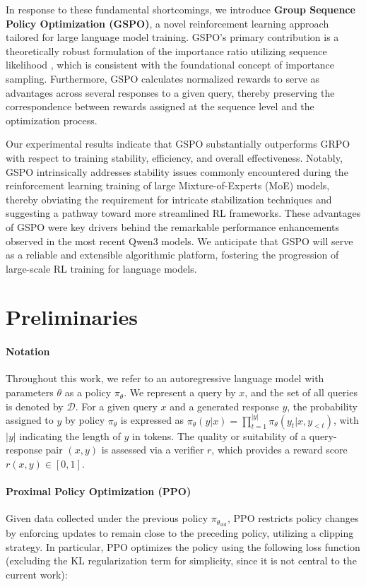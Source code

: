 In response to these fundamental shortcomings, we introduce \textbf{Group Sequence Policy Optimization (GSPO)}, a novel reinforcement learning approach tailored for large language model training. GSPO's primary contribution is a theoretically robust formulation of the importance ratio utilizing sequence likelihood \citep{click}, which is consistent with the foundational concept of importance sampling. Furthermore, GSPO calculates normalized rewards to serve as advantages across several responses to a given query, thereby preserving the correspondence between rewards assigned at the sequence level and the optimization process.

Our experimental results indicate that GSPO substantially outperforms GRPO with respect to training stability, efficiency, and overall effectiveness. Notably, GSPO intrinsically addresses stability issues commonly encountered during the reinforcement learning training of large Mixture-of-Experts (MoE) models, thereby obviating the requirement for intricate stabilization techniques and suggesting a pathway toward more streamlined RL frameworks. These advantages of GSPO were key drivers behind the remarkable performance enhancements observed in the most recent Qwen3 models. We anticipate that GSPO will serve as a reliable and extensible algorithmic platform, fostering the progression of large-scale RL training for language models.

\section{Preliminaries}

\paragraph{Notation}
Throughout this work, we refer to an autoregressive language model with parameters $\theta$ as a policy $\pi_\theta$. We represent a query by $x$, and the set of all queries is denoted by $\mathcal{D}$. For a given query $x$ and a generated response $y$, the probability assigned to $y$ by policy $\pi_\theta$ is expressed as $\pi_\theta (y | x)=\prod_{t=1}^{|y|} \pi_\theta (y_t | x, y_{<t} )$, with $|y|$ indicating the length of $y$ in tokens. The quality or suitability of a query-response pair $(x, y)$ is assessed via a verifier $r$, which provides a reward score $r(x, y) \in [ 0, 1 ]$.

\paragraph{Proximal Policy Optimization (PPO)} Given data collected under the previous policy $\pi_{\theta_\text{old}}$, PPO \citep{ppo} restricts policy changes by enforcing updates to remain close to the preceding policy, utilizing a clipping strategy. In particular, PPO optimizes the policy using the following loss function (excluding the KL regularization term for simplicity, since it is not central to the current work):

